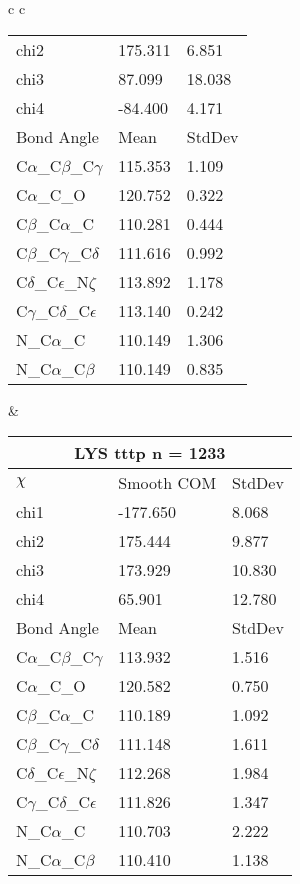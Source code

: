 \begin{longtable}{ c c }
\begin{tabular}{ l l l }
  chi2 & 175.311 & 6.851 \\ 
  chi3 & 87.099 & 18.038 \\ 
  chi4 & -84.400 & 4.171 \\ \midrule
  Bond Angle   & Mean     & StdDev \\ \midrule
  C$\alpha$\_C$\beta$\_C$\gamma$ & 115.353 & 1.109\\
  C$\alpha$\_C\_O & 120.752 & 0.322\\
  C$\beta$\_C$\alpha$\_C & 110.281 & 0.444\\
  C$\beta$\_C$\gamma$\_C$\delta$ & 111.616 & 0.992\\
  C$\delta$\_C$\epsilon$\_N$\zeta$ & 113.892 & 1.178\\
  C$\gamma$\_C$\delta$\_C$\epsilon$ & 113.140 & 0.242\\
  N\_C$\alpha$\_C & 110.149 & 1.306\\
  N\_C$\alpha$\_C$\beta$ & 110.149 & 0.835\\
  \bottomrule
  \end{tabular}
  &
  \begin{tabular}{ l l l }
  \toprule
  \multicolumn{3}{c}{LYS \textbf{tttp} n = 1233} \\ \toprule
  $\chi$       & Smooth COM & StdDev \\ \midrule
  chi1 & -177.650 & 8.068 \\ 
  chi2 & 175.444 & 9.877 \\ 
  chi3 & 173.929 & 10.830 \\ 
  chi4 & 65.901 & 12.780 \\ \midrule
  Bond Angle   & Mean     & StdDev \\ \midrule
  C$\alpha$\_C$\beta$\_C$\gamma$ & 113.932 & 1.516\\
  C$\alpha$\_C\_O & 120.582 & 0.750\\
  C$\beta$\_C$\alpha$\_C & 110.189 & 1.092\\
  C$\beta$\_C$\gamma$\_C$\delta$ & 111.148 & 1.611\\
  C$\delta$\_C$\epsilon$\_N$\zeta$ & 112.268 & 1.984\\
  C$\gamma$\_C$\delta$\_C$\epsilon$ & 111.826 & 1.347\\
  N\_C$\alpha$\_C & 110.703 & 2.222\\
  N\_C$\alpha$\_C$\beta$ & 110.410 & 1.138\\
  \bottomrule
  \end{tabular}
  \\
  \begin{tabular}{ l l l }

\end{tabular}
\end{longtable}
